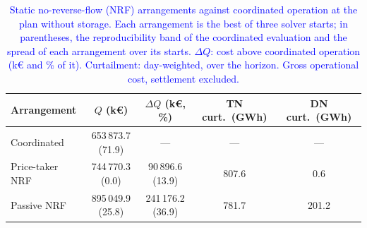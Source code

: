 \begin{table}[htbp!]
    \centering
    \caption{\textcolor{blue}{Static no-reverse-flow (NRF) arrangements against coordinated operation at the plan without storage. Each arrangement is the best of three solver starts; in parentheses, the reproducibility band of the coordinated evaluation and the spread of each arrangement over its starts. $\Delta Q$: cost above coordinated operation (k\euro{} and \% of it). Curtailment: day-weighted, over the horizon. Gross operational cost, settlement excluded.}}
    \label{tab:res_benchmark}
    \footnotesize\setlength{\tabcolsep}{3pt}
    \begin{tabular}{l c c c c}
        \toprule
        Arrangement & $Q$ (k\euro) & $\Delta Q$ (k\euro, \%) & TN curt.\ (GWh) & DN curt.\ (GWh) \\
        \midrule
        Coordinated     & 653\,873.7 (71.9) & ---                & ---   & ---   \\
        Price-taker NRF & 744\,770.3 (0.0)  & 90\,896.6 (13.9)   & 807.6 & 0.6   \\
        Passive NRF     & 895\,049.9 (25.8) & 241\,176.2 (36.9)  & 781.7 & 201.2 \\
        \bottomrule
    \end{tabular}
\end{table}

